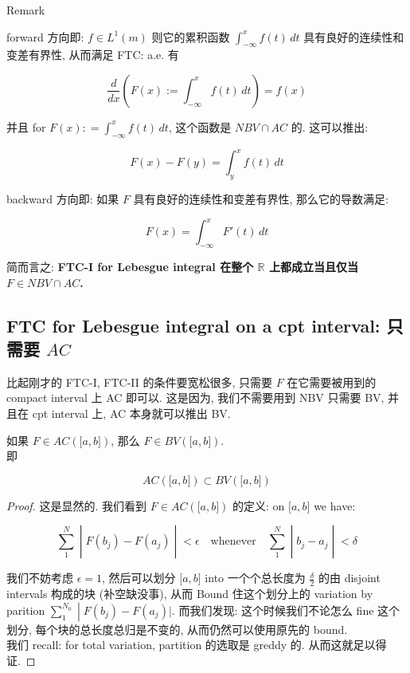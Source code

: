 \documentclass{qlnotes-export}
\begin{document}
\begin{qlremark}{Remark}

forward 方向即: \(f \in L^{1}(m)\) 则它的累积函数 \(\int_{- \infty}^{x}f(t)\, dt\) 具有良好的连续性和变差有界性, 从而满足 FTC: a.e. 有

\[\frac{d}{dx}(F(x) := \int_{- \infty}^{x}f(t)\, dt) = f(x)\]

并且 for \(F(x): = \int_{- \infty}^{x}f(t)\, dt\), 这个函数是 \(NBV \cap AC\) 的. 这可以推出:

\[F(x) - F(y) = \int_{y}^{x}f(t)\, dt\]

backward 方向即: 如果 \(F\) 具有良好的连续性和变差有界性, 那么它的导数满足:

\[F(x) = \int_{- \infty}^{x}F'(t)\, dt\]

简而言之: \textbf{FTC-I for Lebesgue integral 在整个 \(\mathbb{R}\) 上都成立当且仅当 \(F \in NBV \cap AC\).}

\end{qlremark}

\subsection{\texorpdfstring{FTC for Lebesgue integral on a cpt interval: 只需要 \(AC\)}{FTC for Lebesgue integral on a cpt interval: 只需要 AC}}\label{ftc-for-lebesgue-integral-on-a-cpt-interval-ux53eaux9700ux8981-ac}

比起刚才的 FTC-I, FTC-II 的条件要宽松很多, 只需要 \(F\) 在它需要被用到的 compact interval 上 AC 即可以. 这是因为, 我们不需要用到 NBV 只需要 BV, 并且在 cpt interval 上, AC 本身就可以推出 BV.

\begin{lemma}

如果 \(F \in AC(\lbrack a,b\rbrack)\), 那么 \(F \in BV(\lbrack a,b\rbrack)\).\\
即

\[AC(\lbrack a,b\rbrack) \subset BV(\lbrack a,b\rbrack)\]

\end{lemma}

\begin{proof}

这是显然的. 我们看到 \(F \in AC(\lbrack a,b\rbrack)\) 的定义: on \(\lbrack a,b\rbrack\) we have:

\[\left. \sum\limits_{1}^{N} \middle| F(b_{j}) - F(a_{j}) \middle| < \epsilon\quad\text{whenever}\quad\sum\limits_{1}^{N} \middle| b_{j} - a_{j} \middle| < \delta \right.\]

我们不妨考虑 \(\epsilon = 1\), 然后可以划分 \(\lbrack a,b\rbrack\) into 一个个总长度为 \(\frac{\delta}{2}\) 的由 disjoint intervals 构成的块 (补空缺没事), 从而 Bound 住这个划分上的 variation by parition \(\left. \sum_{1}^{N_{0}} \middle| F(b_{j}) - F(a_{j})| \right.\). 而我们发现: 这个时候我们不论怎么 fine 这个划分, 每个块的总长度总归是不变的, 从而仍然可以使用原先的 bound.\\
我们 recall: for total variation, partition 的选取是 greddy 的. 从而这就足以得证.

\end{proof}
\end{document}
